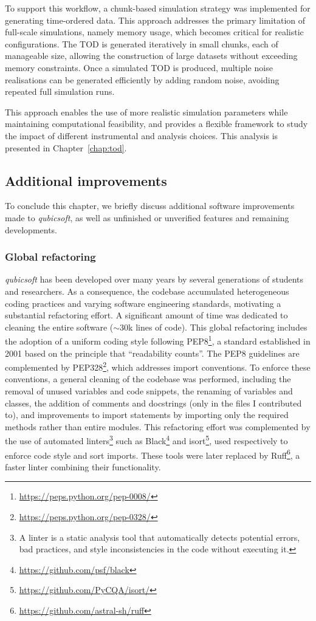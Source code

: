 \documentclass[../../thesis.tex]{subfiles}
\begin{document}
To support this workflow, a chunk-based simulation strategy was implemented for generating time-ordered data. This approach addresses the primary limitation of full-scale simulations, namely memory usage, which becomes critical for realistic configurations. The TOD is generated iteratively in small chunks, each of manageable size, allowing the construction of large datasets without exceeding memory constraints. Once a simulated TOD is produced, multiple noise realisations can be generated efficiently by adding random noise, avoiding repeated full simulation runs.

This approach enables the use of more realistic simulation parameters while maintaining computational feasibility, and provides a flexible framework to study the impact of different instrumental and analysis choices. This analysis is presented in Chapter~\ref{chap:tod}.

\subsection{Additional improvements}

To conclude this chapter, we briefly discuss additional software improvements made to \emph{qubicsoft}, as well as unfinished or unverified features and remaining developments.

\subsubsection{Global refactoring}

\emph{qubicsoft} has been developed over many years by several generations of students and researchers. As a consequence, the codebase accumulated heterogeneous coding practices and varying software engineering standards, motivating a substantial refactoring effort. A significant amount of time was dedicated to cleaning the entire software ($\sim 30$k lines of code).
This global refactoring includes the adoption of a uniform coding style following PEP8\footnote{\url{https://peps.python.org/pep-0008/}}, a standard established in 2001 based on the principle that \enquote{readability counts}. The PEP8 guidelines are complemented by PEP328\footnote{\url{https://peps.python.org/pep-0328/}}, which addresses import conventions.
To enforce these conventions, a general cleaning of the codebase was performed, including the removal of unused variables and code snippets, the renaming of variables and classes, the addition of comments and docstrings (only in the files I contributed to), and improvements to import statements by importing only the required methods rather than entire modules. This refactoring effort was complemented by the use of automated linters\footnote{A linter is a static analysis tool that automatically detects potential errors, bad practices, and style inconsistencies in the code without executing it.} such as Black\footnote{\url{https://github.com/psf/black}} and isort\footnote{\url{https://github.com/PyCQA/isort/}}, used respectively to enforce code style and sort imports. These tools were later replaced by Ruff\footnote{\url{https://github.com/astral-sh/ruff}}, a faster linter combining their functionality.
\end{document}
